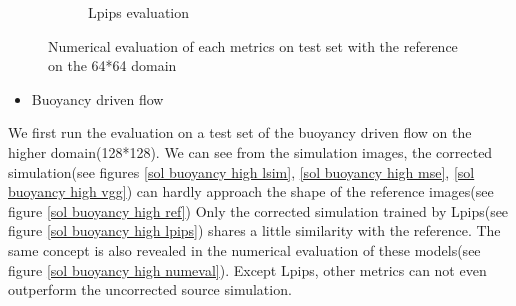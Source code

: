 \documentclass[a4paper,12pt,twoside]{report}
\begin{document}
\begin{figure}
\begin{subfigure}{0.32\textwidth}
		\caption{Lpips evaluation}
	\end{subfigure}
	\caption{Numerical evaluation of each metrics on test set with the reference on the 64*64 domain}
	\label{sol karman low numeval}
\end{figure}

\begin{itemize}
  \item Buoyancy driven flow
\end{itemize}
We first run the evaluation on a test set of the buoyancy driven flow on the higher domain(128*128). We can see from the simulation images, the corrected simulation(see figures \ref{sol buoyancy high lsim}, \ref{sol buoyancy high mse}, \ref{sol buoyancy high vgg}) can hardly approach the shape of the reference images(see figure \ref{sol buoyancy high ref}) Only the corrected simulation trained by Lpips(see figure \ref{sol buoyancy high lpips}) shares a little similarity with the reference. The same concept is also revealed in the numerical evaluation of these models(see figure \ref{sol buoyancy high numeval}). Except Lpips, other metrics can not even outperform the uncorrected source simulation. 
\end{document}
